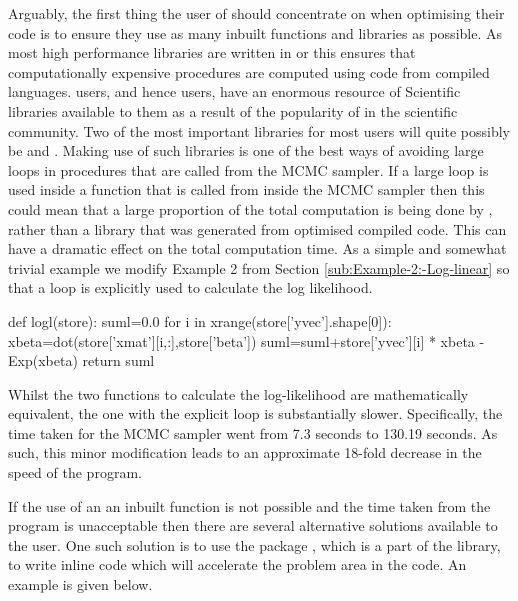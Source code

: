 \documentclass[article]{jss}
\begin{document}
Arguably, the first thing the user of  should concentrate
on when optimising their  code is to ensure they use as
many inbuilt functions and libraries as possible. As most high
performance libraries are written in  or
 this ensures that computationally expensive
procedures are computed using code from compiled languages.
 users, and hence  users, have an
enormous resource of Scientific libraries available to them as a
result of the popularity of  in the scientific
community. Two of the most important libraries for most users will
quite possibly be  and . Making use of such
libraries is one of the best ways of avoiding large loops in
procedures that are called from the MCMC sampler. If a large loop is
used inside a function that is called from inside the MCMC sampler
then this could mean that a large proportion of the total computation
is being done by , rather than a library that was
generated from optimised compiled code. This can have a dramatic
effect on the total computation time. As a simple and somewhat trivial
example we modify Example 2 from Section \ref{sub:Example-2:-Log-linear}
so that a loop is explicitly used to calculate the log likelihood.




\begin{Code}
def logl(store):
    suml=0.0
    for i in xrange(store['yvec'].shape[0]):
        xbeta=dot(store['xmat'][i,:],store['beta'])
        suml=suml+store['yvec'][i] * xbeta - Exp(xbeta)
    return suml
\end{Code}

Whilst the two functions to calculate the log-likelihood are
mathematically equivalent, the one with the explicit loop is
substantially slower.  Specifically, the time taken for the MCMC
sampler went from 7.3 seconds to 130.19 seconds. As such, this minor
modification leads to an approximate 18-fold decrease in the speed of
the program.

If the use of an an inbuilt function is not possible and the time
taken from the program is unacceptable then there are several
alternative solutions available to the user. One such solution is to
use the package , which is a part of the 
library, to write inline  code which will accelerate the
problem area in the code. An example is given below.
\end{document}
